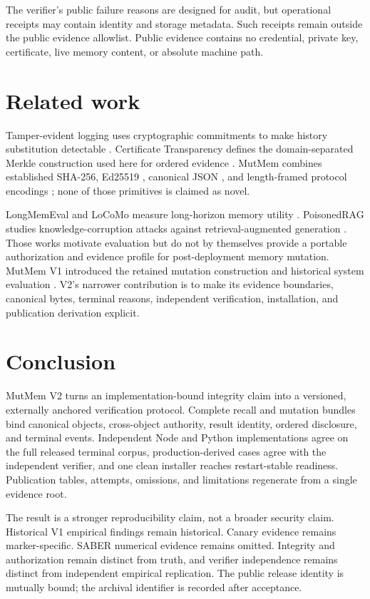 \documentclass[10pt]{article}
\begin{document}
The verifier's public failure reasons are designed for audit, but operational
receipts may contain identity and storage metadata. Such receipts remain outside
the public evidence allowlist. Public evidence contains no credential, private
key, certificate, live memory content, or absolute machine path.

\section{Related work}

Tamper-evident logging uses cryptographic commitments to make history
substitution detectable \cite{crosbywallach}. Certificate Transparency defines
the domain-separated Merkle construction used here for ordered evidence
\cite{rfc6962}. MutMem combines established SHA-256, Ed25519 \cite{rfc8032},
canonical JSON \cite{rfc8785}, and length-framed protocol encodings
\cite{bonehshoup}; none of those primitives is claimed as novel.

LongMemEval and LoCoMo measure long-horizon memory utility
\cite{longmemeval,locomo}. PoisonedRAG studies knowledge-corruption attacks
against retrieval-augmented generation \cite{poisonedrag}. Those works motivate
evaluation but do not by themselves provide a portable authorization and
evidence profile for post-deployment memory mutation. MutMem V1 introduced the
retained mutation construction and historical system evaluation
\cite{mutmemv1}. V2's narrower contribution is to make its evidence boundaries,
canonical bytes, terminal reasons, independent verification, installation, and
publication derivation explicit.

\section{Conclusion}

MutMem V2 turns an implementation-bound integrity claim into a versioned,
externally anchored verification protocol. Complete recall and mutation bundles
bind canonical objects, cross-object authority, result identity, ordered
disclosure, and terminal events. Independent Node and Python implementations
agree on the full released terminal corpus, production-derived cases agree with
the independent verifier, and one clean installer reaches restart-stable
readiness. Publication tables, attempts, omissions, and limitations regenerate
from a single evidence root.

The result is a stronger reproducibility claim, not a broader security claim.
Historical V1 empirical findings remain historical. Canary evidence remains
marker-specific. SABER numerical evidence remains omitted. Integrity and
authorization remain distinct from truth, and verifier independence remains
distinct from independent empirical replication. The public release identity
is mutually bound; the archival identifier is recorded after acceptance.
\end{document}

